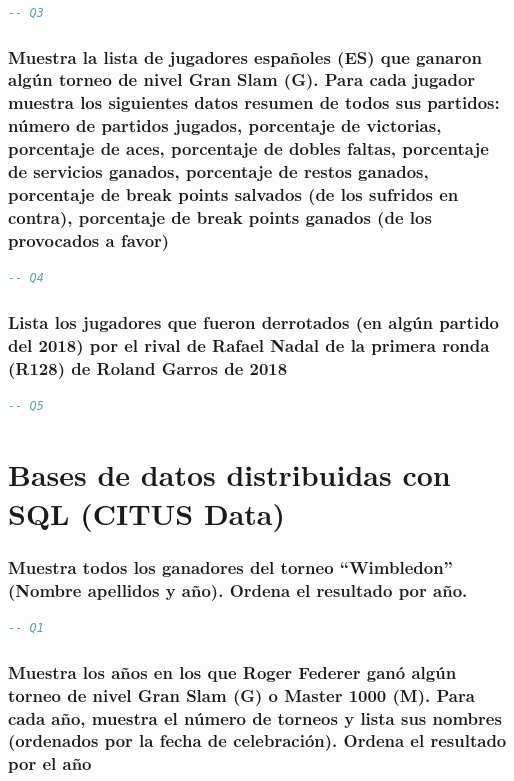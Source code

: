 \documentclass[10pt]{opticajnl}
\begin{document}
\begin{lstlisting}[language=SQL]
-- Q3
\end{lstlisting}





\subsubsection{Muestra la lista de jugadores españoles (ES) que ganaron algún torneo de nivel Gran Slam (G). Para cada jugador muestra los siguientes datos resumen de todos sus partidos: número de partidos jugados, porcentaje de victorias, porcentaje de aces, porcentaje de dobles faltas, porcentaje de servicios ganados, porcentaje de restos ganados, porcentaje de break points salvados (de los sufridos en contra), porcentaje de break points ganados (de los provocados a favor)}

\begin{lstlisting}[language=SQL]
-- Q4
\end{lstlisting}





\subsubsection{Lista los jugadores que fueron derrotados (en algún partido del 2018) por el rival de Rafael Nadal de la primera ronda (R128) de Roland Garros de 2018}

\begin{lstlisting}[language=SQL]
-- Q5
\end{lstlisting}


\section{Bases de datos distribuidas con SQL (CITUS Data)}

\subsubsection{Muestra todos los ganadores del torneo ``Wimbledon'' (Nombre apellidos y año). Ordena el resultado por año.}

\begin{lstlisting}[language=SQL]
-- Q1
\end{lstlisting}





\subsubsection{Muestra los años en los que Roger Federer ganó algún torneo de nivel Gran Slam (G) o Master 1000 (M). Para cada año, muestra el número de torneos y lista sus nombres (ordenados por la fecha de celebración). Ordena el resultado por el año}
\end{document}
